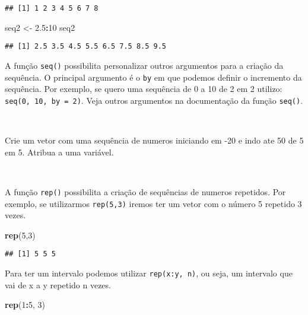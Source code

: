 \documentclass[]{book}
\newenvironment{Shaded}{\begin{snugshade}}{\end{snugshade}}
\newcommand{\DecValTok}[1]{\textcolor[rgb]{0.00,0.00,0.81}{#1}}
\newcommand{\FloatTok}[1]{\textcolor[rgb]{0.00,0.00,0.81}{#1}}
\newcommand{\KeywordTok}[1]{\textcolor[rgb]{0.13,0.29,0.53}{\textbf{#1}}}
\newcommand{\NormalTok}[1]{#1}
\newcommand{\OperatorTok}[1]{\textcolor[rgb]{0.81,0.36,0.00}{\textbf{#1}}}
\newcommand{\StringTok}[1]{\textcolor[rgb]{0.31,0.60,0.02}{#1}}
\theoremstyle{definition}
\theoremstyle{definition}
\theoremstyle{definition}
\theoremstyle{remark}
\let\BeginKnitrBlock\begin \let\EndKnitrBlock\end
\begin{document}
\begin{verbatim}
## [1] 1 2 3 4 5 6 7 8
\end{verbatim}

\begin{Shaded}
\begin{Highlighting}[]
\NormalTok{seq2 <-}\StringTok{ }\FloatTok{2.5}\OperatorTok{:}\DecValTok{10}
\NormalTok{seq2}
\end{Highlighting}
\end{Shaded}

\begin{verbatim}
## [1] 2.5 3.5 4.5 5.5 6.5 7.5 8.5 9.5
\end{verbatim}

A função \texttt{seq()} possibilita personalizar outros argumentos para a criação da sequência. O principal argumento é o \texttt{by} em que podemos definir o incremento da sequência. Por exemplo, se quero uma sequência de 0 a 10 de 2 em 2 utilizo: \texttt{seq(0,\ 10,\ by\ =\ 2)}. Veja outros argumentos na documentação da função \texttt{seq()}.

~

\BeginKnitrBlock{exercise}
\protect\hypertarget{exr:unnamed-chunk-44}{}{\label{exr:unnamed-chunk-44} }Crie um vetor com uma sequência de numeros iniciando em -20 e indo ate 50 de 5 em 5. Atribua a uma variável.
\EndKnitrBlock{exercise}

~

A função \texttt{rep()} possibilita a criação de sequências de numeros repetidos. Por exemplo, se utilizarmos \texttt{rep(5,3)} iremos ter um vetor com o número 5 repetido 3 vezes.

\begin{Shaded}
\begin{Highlighting}[]
\KeywordTok{rep}\NormalTok{(}\DecValTok{5}\NormalTok{,}\DecValTok{3}\NormalTok{)}
\end{Highlighting}
\end{Shaded}

\begin{verbatim}
## [1] 5 5 5
\end{verbatim}

Para ter um intervalo podemos utilizar \texttt{rep(x:y,\ n)}, ou seja, um intervalo que vai de x a y repetido n vezes.

\begin{Shaded}
\begin{Highlighting}[]
\KeywordTok{rep}\NormalTok{(}\DecValTok{1}\OperatorTok{:}\DecValTok{5}\NormalTok{, }\DecValTok{3}\NormalTok{)}
\end{Highlighting}
\end{Shaded}
\end{document}
